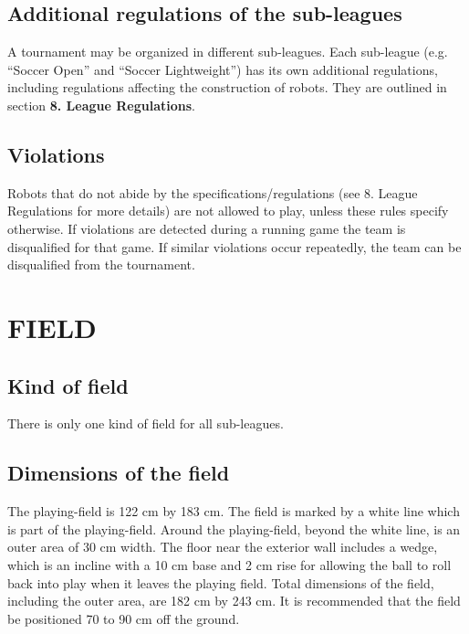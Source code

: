 \documentclass{article}
\begin{document}
\subsection{ Additional regulations of the sub-leagues \label{ref-026}}

A tournament may be organized in different sub-leagues. Each sub-league (e.g.
``Soccer Open'' and ``Soccer Lightweight'') has its own additional regulations,
including regulations affecting the construction of robots. They are outlined
in section \textbf{8. League Regulations}.

\subsection{ Violations \label{ref-027}}

Robots that do not abide by the specifications/regulations (see 8. League
Regulations for more details) are not allowed to play, unless these rules
specify otherwise. If violations are detected during a running game the team is
disqualified for that game. If similar violations occur repeatedly, the team
can be disqualified from the tournament.

\section{FIELD \label{ref-028}}

\subsection{Kind of field \label{ref-029}}

There is only one kind of field for all sub-leagues.

\subsection{ Dimensions of the field \label{ref-030}}

The playing-field is 122 cm by 183 cm. The field is marked by a white line
which is part of the playing-field. Around the playing-field, beyond the white
line, is an outer area of 30 cm width. The floor near the exterior wall
includes a wedge, which is an incline with a 10 cm base and 2 cm rise for
allowing the ball to roll back into play when it leaves the playing field.
Total dimensions of the field, including the outer area, are 182 cm by 243 cm.
It is recommended that the field be positioned 70 to 90 cm off the ground.
\end{document}
